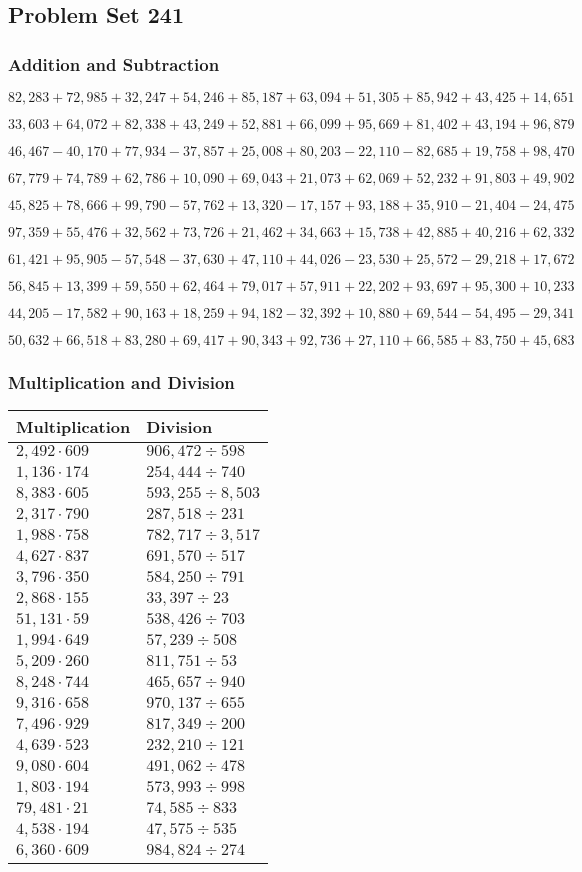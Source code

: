 \hypertarget{problem-set-241}{%
\subsection{Problem Set 241}\label{problem-set-241}}

\hypertarget{addition-and-subtraction}{%
\subsubsection{Addition and
Subtraction}\label{addition-and-subtraction}}

\(82,283+72,985+32,247+54,246+85,187+63,094+51,305+85,942+43,425+14,651\)

\(33,603+64,072+82,338+43,249+52,881+66,099+95,669+81,402+43,194+96,879\)

\(46,467-40,170+77,934-37,857+25,008+80,203-22,110-82,685+19,758+98,470\)

\(67,779+74,789+62,786+10,090+69,043+21,073+62,069+52,232+91,803+49,902\)

\(45,825+78,666+99,790-57,762+13,320-17,157+93,188+35,910-21,404-24,475\)

\(97,359+55,476+32,562+73,726+21,462+34,663+15,738+42,885+40,216+62,332\)

\(61,421+95,905-57,548-37,630+47,110+44,026-23,530+25,572-29,218+17,672\)

\(56,845+13,399+59,550+62,464+79,017+57,911+22,202+93,697+95,300+10,233\)

\(44,205-17,582+90,163+18,259+94,182-32,392+10,880+69,544-54,495-29,341\)

\(50,632+66,518+83,280+69,417+90,343+92,736+27,110+66,585+83,750+45,683\)

\hypertarget{multiplication-and-division}{%
\subsubsection{Multiplication and
Division}\label{multiplication-and-division}}

\begin{longtable}[]{@{}ll@{}}
\toprule
Multiplication & Division\tabularnewline
\midrule
\endhead
\(2,492\cdot609\) & \(906,472÷598\)\tabularnewline
\(1,136\cdot174\) & \(254,444÷740\)\tabularnewline
\(8,383\cdot605\) & \(593,255÷8,503\)\tabularnewline
\(2,317\cdot790\) & \(287,518÷231\)\tabularnewline
\(1,988\cdot758\) & \(782,717÷3,517\)\tabularnewline
\(4,627\cdot837\) & \(691,570÷517\)\tabularnewline
\(3,796\cdot350\) & \(584,250÷791\)\tabularnewline
\(2,868\cdot155\) & \(33,397÷23\)\tabularnewline
\(51,131\cdot59\) & \(538,426÷703\)\tabularnewline
\(1,994\cdot649\) & \(57,239÷508\)\tabularnewline
\(5,209\cdot260\) & \(811,751÷53\)\tabularnewline
\(8,248\cdot744\) & \(465,657÷940\)\tabularnewline
\(9,316\cdot658\) & \(970,137÷655\)\tabularnewline
\(7,496\cdot929\) & \(817,349÷200\)\tabularnewline
\(4,639\cdot523\) & \(232,210÷121\)\tabularnewline
\(9,080\cdot604\) & \(491,062÷478\)\tabularnewline
\(1,803\cdot194\) & \(573,993÷998\)\tabularnewline
\(79,481\cdot21\) & \(74,585÷833\)\tabularnewline
\(4,538\cdot194\) & \(47,575÷535\)\tabularnewline
\(6,360\cdot609\) & \(984,824÷274\)\tabularnewline
\bottomrule
\end{longtable}
